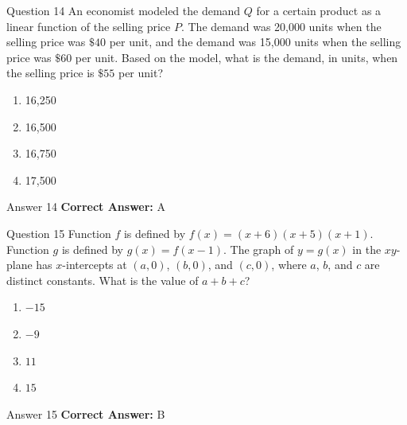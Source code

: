 \documentclass{beamer}
\begin{document}
\begin{frame}{Question 14}
\small
An economist modeled the demand \( Q \) for a certain product as a linear function of the selling price \( P \). The demand was 20,000 units when the selling price was \(\$40\) per unit, and the demand was 15,000 units when the selling price was \(\$60\) per unit. Based on the model, what is the demand, in units, when the selling price is \(\$55\) per unit?
\vspace{0.35cm}
\begin{enumerate}
    \item[A.] 16,250
    \item[B.] 16,500
    \item[C.] 16,750
    \item[D.] 17,500
\end{enumerate}

\end{frame}
\begin{frame}{Answer 14}
\small
\textbf{Correct Answer:} A
\end{frame}

\begin{frame}{Question 15}
\small
Function \(\displaystyle f\) is defined by \(\displaystyle f(x) = (x + 6)(x + 5)(x + 1)\). Function \(\displaystyle g\) is defined by \(\displaystyle g(x) = f(x - 1)\). The graph of \(\displaystyle y = g(x)\) in the \(\displaystyle xy\)-plane has \(\displaystyle x\)-intercepts at \(\displaystyle (a, 0)\), \(\displaystyle (b, 0)\), and \(\displaystyle (c, 0)\), where \(\displaystyle a\), \(\displaystyle b\), and \(\displaystyle c\) are distinct constants. What is the value of \(\displaystyle a + b + c\)?
\vspace{0.35cm}
\begin{enumerate}
    \item[A.] \(\displaystyle -15\)
    \item[B.] \(\displaystyle -9\)
    \item[C.] \(\displaystyle 11\)
    \item[D.] \(\displaystyle 15\)
\end{enumerate}

\end{frame}
\begin{frame}{Answer 15}
\small
\textbf{Correct Answer:} B
\end{frame}
\end{document}
